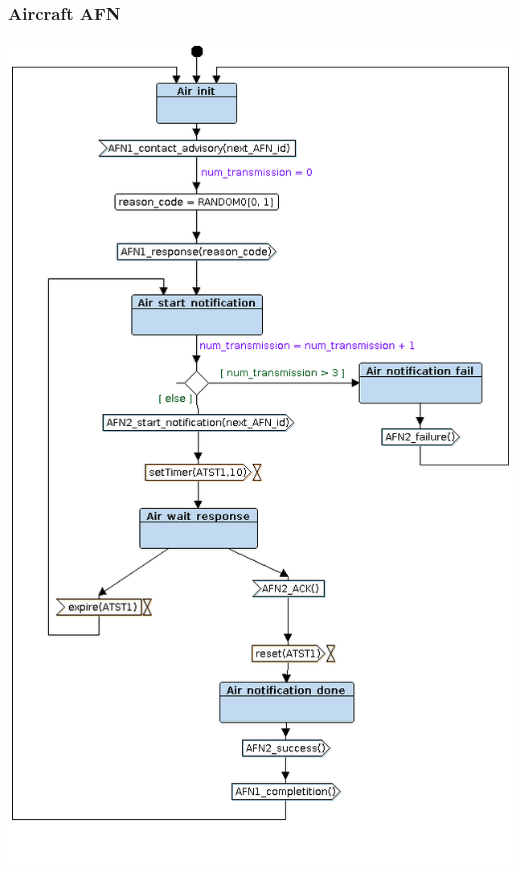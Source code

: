 \documentclass{article}
\begin{document}
\subsubsection{Aircraft AFN}
\includegraphics[width=\textwidth]{./lab2_08.png}
\end{document}
